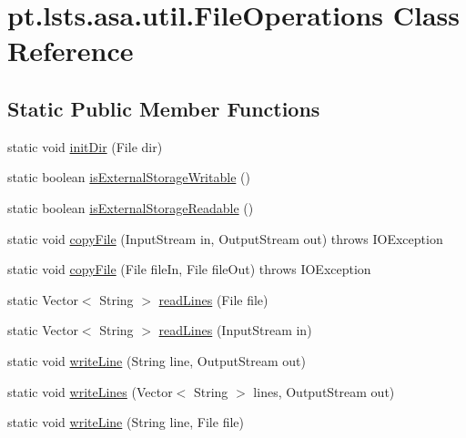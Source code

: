 \hypertarget{classpt_1_1lsts_1_1asa_1_1util_1_1FileOperations}{}\section{pt.\+lsts.\+asa.\+util.\+File\+Operations Class Reference}
\label{classpt_1_1lsts_1_1asa_1_1util_1_1FileOperations}
\subsection*{Static Public Member Functions}
\begin{DoxyCompactItemize}
\item 
static void \hyperlink{classpt_1_1lsts_1_1asa_1_1util_1_1FileOperations_a56f20a01c88e7ea22a750483046ec1af}{init\+Dir} (File dir)
\item 
static boolean \hyperlink{classpt_1_1lsts_1_1asa_1_1util_1_1FileOperations_a94d5def017a990d766d8a7ba22305d83}{is\+External\+Storage\+Writable} ()
\item 
static boolean \hyperlink{classpt_1_1lsts_1_1asa_1_1util_1_1FileOperations_abd3c62a82ebb5db762c6d6b1f07b9635}{is\+External\+Storage\+Readable} ()
\item 
static void \hyperlink{classpt_1_1lsts_1_1asa_1_1util_1_1FileOperations_a9f288d8c05ae35b8d493976b2a0d683c}{copy\+File} (Input\+Stream in, Output\+Stream out)  throws I\+O\+Exception 
\item 
static void \hyperlink{classpt_1_1lsts_1_1asa_1_1util_1_1FileOperations_ac01327249ace222fe46f68e5f1e8f889}{copy\+File} (File file\+In, File file\+Out)  throws I\+O\+Exception 
\item 
static Vector$<$ String $>$ \hyperlink{classpt_1_1lsts_1_1asa_1_1util_1_1FileOperations_aa354fab4ccc07e50fa04bc6f1984cd42}{read\+Lines} (File file)
\item 
static Vector$<$ String $>$ \hyperlink{classpt_1_1lsts_1_1asa_1_1util_1_1FileOperations_adab6a6a9933ed2eb17635d76113fedc1}{read\+Lines} (Input\+Stream in)
\item 
static void \hyperlink{classpt_1_1lsts_1_1asa_1_1util_1_1FileOperations_aafd349197f86f3acefdbe681f0e62971}{write\+Line} (String line, Output\+Stream out)
\item 
static void \hyperlink{classpt_1_1lsts_1_1asa_1_1util_1_1FileOperations_aafda98f402e49f29ccf9737207d35202}{write\+Lines} (Vector$<$ String $>$ lines, Output\+Stream out)
\item 
static void \hyperlink{classpt_1_1lsts_1_1asa_1_1util_1_1FileOperations_a939a8966779f64f2784f591ff1676fe8}{write\+Line} (String line, File file)

\end{DoxyCompactItemize}
